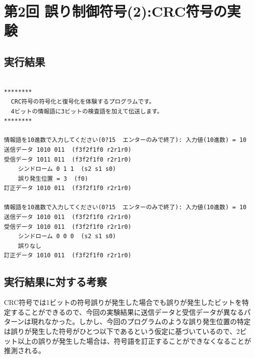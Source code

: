 \documentclass[a4j]{celb-report}
\begin{document}
\newpage
\section{第2回 誤り制御符号(2):CRC符号の実験}
\subsection{実行結果}
\begin{lstlisting}[basicstyle=\ttfamily\footnotesize, frame=single]

********
  CRC符号の符号化と復号化を体験するプログラムです。
  4ビットの情報語に3ビットの検査語を加えて伝送します。
********

情報語を10進数で入力してください(0?15  エンターのみで終了): 入力値(10進数) = 10
送信データ 1010 011  (f3f2f1f0 r2r1r0)
受信データ 1011 011  (f3f2f1f0 r2r1r0)
    シンドローム 0 1 1  (s2 s1 s0) 
    誤り発生位置 = 3  (f0)
訂正データ 1010 011  (f3f2f1f0 r2r1r0)

情報語を10進数で入力してください(0?15  エンターのみで終了): 入力値(10進数) = 10
送信データ 1010 011  (f3f2f1f0 r2r1r0)
受信データ 1010 011  (f3f2f1f0 r2r1r0)
    シンドローム 0 0 0  (s2 s1 s0) 
    誤りなし
訂正データ 1010 011  (f3f2f1f0 r2r1r0)

\end{lstlisting}
\subsection{実行結果に対する考察}
CRC符号では1ビットの符号誤りが発生した場合でも誤りが発生したビットを特定することができるので、今回の実験結果に送信データと受信データが異なるパターンは現れなかった。しかし、今回のプログラムのような誤り発生位置の特定は誤りが発生した符号がひとつ以下であるという仮定に基づいているので、2ビット以上の誤りが発生した場合は、符号語を訂正することができなくなることが推測される。
\end{document}
